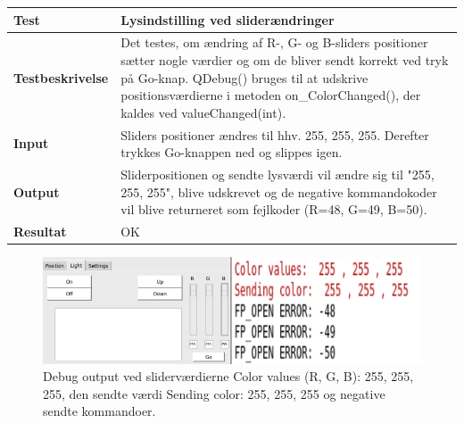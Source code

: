\begin{table}[H]
\begin{tabular}{|l|l|}\hline
\textbf{Test} & Lysindstilling ved sliderændringer \\\hline

\textbf{Testbeskrivelse} & \multicolumn{1}{|m{11.5cm}|}{Det testes, om ændring af R-, G- og B-sliders positioner sætter nogle værdier og om de bliver sendt korrekt ved tryk på Go-knap.  QDebug() bruges til at udskrive positionsværdierne i metoden on\_ColorChanged(), der kaldes ved valueChanged(int).} \\\hline

\textbf{Input} & \multicolumn{1}{|m{11.5cm}|}{Sliders positioner ændres til hhv. 255, 255, 255. Derefter trykkes Go-knappen ned og slippes igen.} \\\hline

\textbf{Output} & \multicolumn{1}{|m{11.5cm}|}{ Sliderpositionen og sendte lysværdi vil ændre sig til "255, 255, 255", blive udskrevet og de negative kommandokoder vil blive returneret som fejlkoder (R=48, G=49, B=50).} \\\hline

\textbf{Resultat} & \multicolumn{1}{|m{11.5cm}|}{ OK} \\\hline

\end{tabular}
\end{table}

\begin{figure}[H]
\centering
\includegraphics[width=0.9\linewidth]{0_Filer/Figuer/testLight.png}
\caption{Debug output ved sliderværdierne Color values (R, G, B): 255, 255, 255, den sendte værdi Sending color: 255, 255, 255 og negative sendte kommandoer.}
\label{fig:testLight}
\end{figure}



